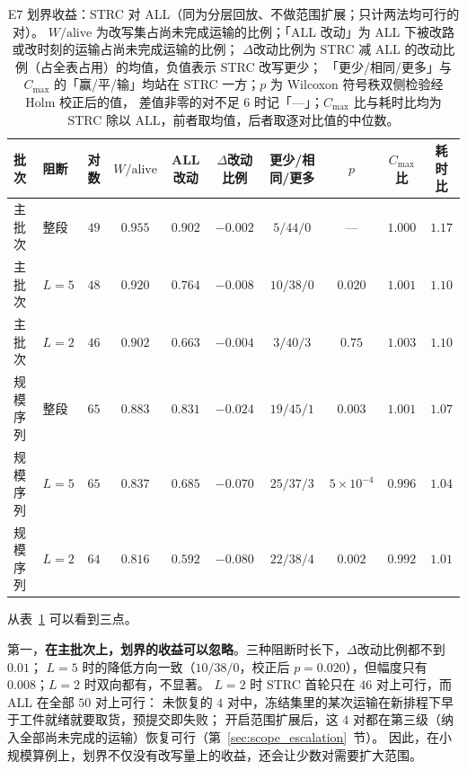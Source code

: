 \documentclass[manuscript,screen,review]{acmart}
\providecommand{\STRC}{\textsc{STRC}}
\begin{document}
\begin{table}[t]
\centering
\caption{E7 划界收益：\STRC{} 对 ALL（同为分层回放、不做范围扩展；只计两法均可行的对）。
\(W/\mathrm{alive}\) 为改写集占尚未完成运输的比例；「ALL 改动」为 ALL 下被改路或改时刻的运输占尚未完成运输的比例；
\(\Delta\)改动比例为 \STRC{} 减 ALL 的改动比例（占全表占用）的均值，负值表示 \STRC{} 改写更少；
「更少/相同/更多」与 \(C_{\max}\) 的「赢/平/输」均站在 \STRC{} 一方；\(p\) 为 Wilcoxon 符号秩双侧检验经 Holm 校正后的值，
差值非零的对不足 \(6\) 时记「---」；\(C_{\max}\) 比与耗时比均为 \STRC{} 除以 ALL，前者取均值，后者取逐对比值的中位数。}
\label{tab:boundary}
\small
\setlength{\tabcolsep}{3pt}
\begin{tabular}{@{}llcccccccc@{}}
\toprule
批次 & 阻断 & 对数 & \(W/\mathrm{alive}\) & ALL 改动 & \(\Delta\)改动比例 & 更少/相同/更多 & \(p\) & \(C_{\max}\) 比 & 耗时比 \\
\midrule
主批次 & 整段 & \(49\) & \(0.955\) & \(0.902\) & \(-0.002\) & \(5/44/0\) & --- & \(1.000\) & \(1.17\) \\
主批次 & \(L=5\) & \(48\) & \(0.920\) & \(0.764\) & \(-0.008\) & \(10/38/0\) & \(0.020\) & \(1.001\) & \(1.10\) \\
主批次 & \(L=2\) & \(46\) & \(0.902\) & \(0.663\) & \(-0.004\) & \(3/40/3\) & \(0.75\) & \(1.003\) & \(1.10\) \\
\addlinespace[2pt]
规模序列 & 整段 & \(65\) & \(0.883\) & \(0.831\) & \(-0.024\) & \(19/45/1\) & \(0.003\) & \(1.001\) & \(1.07\) \\
规模序列 & \(L=5\) & \(65\) & \(0.837\) & \(0.685\) & \(-0.070\) & \(25/37/3\) & \(5\times10^{-4}\) & \(0.996\) & \(1.04\) \\
规模序列 & \(L=2\) & \(64\) & \(0.816\) & \(0.592\) & \(-0.080\) & \(22/38/4\) & \(0.002\) & \(0.992\) & \(1.01\) \\
\bottomrule
\end{tabular}
\end{table}

从表~\ref{tab:boundary} 可以看到三点。

第一，\textbf{在主批次上，划界的收益可以忽略}。三种阻断时长下，\(\Delta\)改动比例都不到 \(0.01\)；
\(L=5\) 时的降低方向一致（\(10/38/0\)，校正后 \(p=0.020\)），但幅度只有 \(0.008\)；\(L=2\) 时双向都有，不显著。
\(L=2\) 时 \STRC{} 首轮只在 \(46\) 对上可行，而 ALL 在全部 \(50\) 对上可行：
未恢复的 \(4\) 对中，冻结集里的某次运输在新排程下早于工件就绪就要取货，预提交即失败；
开启范围扩展后，这 \(4\) 对都在第三级（纳入全部尚未完成的运输）恢复可行（第~\ref{sec:scope_escalation}~节）。
因此，在小规模算例上，划界不仅没有改写量上的收益，还会让少数对需要扩大范围。
\end{document}
